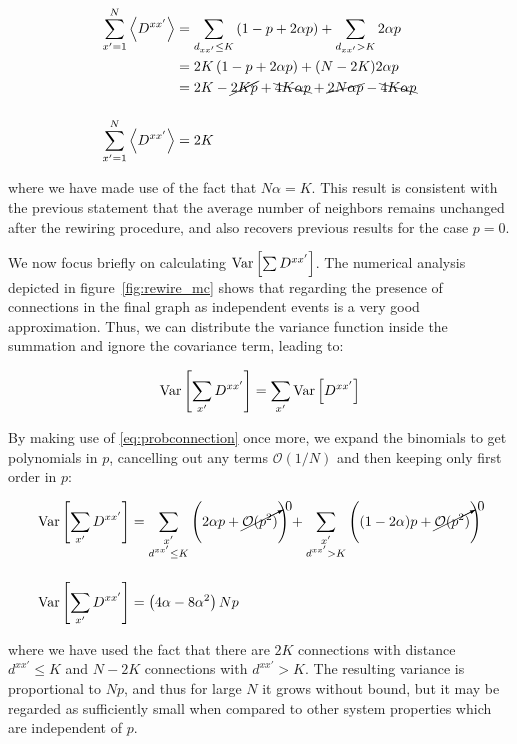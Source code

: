 \begin{align}
  \sum_{x'=1}^N \left< D^{xx'} \right> &= \sum_{d_{xx'}\leq K} \left( 1 - p + 2\alpha p \right) + \sum_{d_{xx'}> K} 2\alpha p \notag\\
  &= 2K\left( 1 - p + 2\alpha p \right) + (N-2K)2\alpha p \notag\\
  &= 2K - \cancel{2Kp} + \bcancel{4K\alpha p} + \cancel{2N\alpha p} - \bcancel{4K\alpha p} \notag\\[12pt]
  \sum_{x'=1}^N \left< D^{xx'} \right> &= 2K
  \label{eq:ppower3}
\end{align}

\noindent where we have made use of the fact that $N\alpha = K$. This result is consistent with the previous statement that the average
number of neighbors remains unchanged after the rewiring procedure, and also recovers previous results\cite{escaff2014arrays} for the
case $p=0$.

We now focus briefly on calculating $\text{Var}\left[{\sum D^{xx'}}\right]$. The numerical analysis depicted in figure~\ref{fig:rewire_mc} shows that
regarding the presence of connections in the final graph as independent events is a very good approximation. Thus, we can distribute
the variance function inside the summation and ignore the covariance term, leading to:

\begin{equation}
  \text{Var}\left[{\sum_{x'}D^{xx'}}\right] = \sum_{x'} \text{Var}\left[{D^{xx'}}\right]
\end{equation}

By making use of \ref{eq:probconnection} once more, we expand the binomials to get polynomials in $p$, cancelling out any terms
$\mathcal{O}(1/N)$ and then keeping only first order in $p$:

\begin{align}
  \text{Var}\left[{\sum_{x'}D^{xx'}}\right] &= \sum_{\substack{x' \\ d^{xx'}\leq K}} \left( 2\alpha p + \cancelto{0}{\mathcal{O}(p^2)} \right) +
  \sum_{\substack{x' \\ d^{xx'} > K}} \left( (1-2\alpha )p + \cancelto{0}{\mathcal{O}(p^2)} \right) \notag\\[12pt]
  \text{Var}\left[{\sum_{x'}D^{xx'}}\right] &= \left(4\alpha-8\alpha^2\right)Np
\end{align}

\noindent where we have used the fact that there are $2K$ connections with distance $d^{xx'}\leq K$ and $N-2K$ connections with
$d^{xx'}>K$. The resulting variance is proportional to $Np$, and thus for large $N$ it grows without bound, but it may be regarded as
sufficiently small when compared to other system properties which are independent of $p$.

